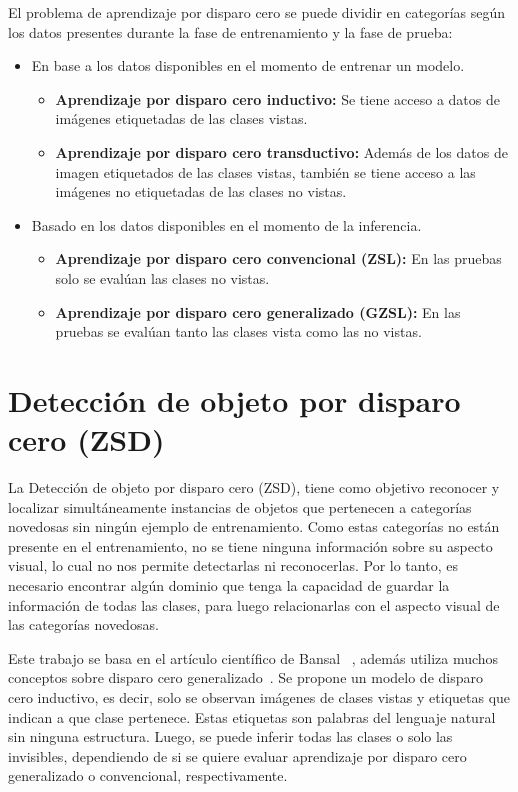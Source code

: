 El problema de aprendizaje por disparo cero se puede dividir en categorías según los datos presentes durante la fase de entrenamiento y la fase de prueba:
\begin{itemize}
	\item En base a los datos disponibles en el momento de entrenar un modelo.
	\begin{itemize}
		\item \textbf{Aprendizaje por disparo cero inductivo:} Se tiene acceso a datos de imágenes etiquetadas de las clases vistas.
		\item \textbf{Aprendizaje por disparo cero transductivo:} Además de los datos de imagen etiquetados de las clases vistas, también se tiene acceso a las imágenes no etiquetadas de las clases no vistas.
	\end{itemize}
	\item Basado en los datos disponibles en el momento de la inferencia.
	\begin{itemize}
		\item \textbf{Aprendizaje por disparo cero convencional (ZSL):} En las pruebas solo se evalúan las clases no vistas.
		\item \textbf{Aprendizaje por disparo cero generalizado (GZSL):} En las pruebas se evalúan tanto las clases vista como las no vistas.
	\end{itemize}
\end{itemize}

\section {Detección de objeto por disparo cero (ZSD)} \label{sec:detecciondeobjetopordisparocero}
La Detección de objeto por disparo cero (ZSD), tiene como objetivo reconocer y localizar simultáneamente instancias de objetos que pertenecen a categorías novedosas sin ningún ejemplo de entrenamiento. Como estas categorías no están presente en el entrenamiento, no se tiene ninguna información sobre su aspecto visual, lo cual no nos permite detectarlas ni reconocerlas. Por lo tanto, es necesario encontrar algún dominio que tenga la capacidad de guardar la información de todas las clases, para luego relacionarlas con el aspecto visual de las categorías novedosas.

Este trabajo se basa en el artículo científico de Bansal \etal ~\cite{bansal2018zero}, además utiliza muchos conceptos sobre disparo cero generalizado~\cite{zero-shot-generalizado}. Se propone un modelo de disparo cero inductivo, es decir, solo se observan imágenes de clases vistas y etiquetas que indican a que clase pertenece. Estas etiquetas son palabras del lenguaje natural sin ninguna estructura. Luego, se puede inferir todas las clases o solo las invisibles, dependiendo de si se quiere evaluar aprendizaje por disparo cero generalizado o convencional, respectivamente.\\ 

